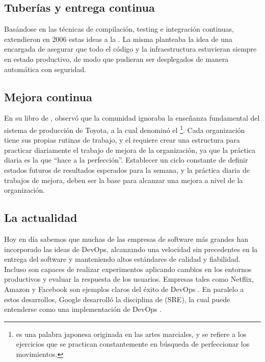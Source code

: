 \subsection{Tuberías y entrega continua}

Basándose en las técnicas de compilación, testing e integración
continuas, \citeauthor{humblefarley} extendieron en 2006 estas ideas a
la 
\cite{humblefarley}. La misma
planteaba la idea de una  encargada de
asegurar que todo el código y la infraestructura estuvieran siempre en
estado productivo, de modo que pudieran ser desplegados de manera
automática con seguridad.

\subsection{Mejora continua}

En su libro de \citeyear{toyotakata}
\cite{toyotakata}, \citeauthor{toyotakata}
observó que la comunidad  ignoraba la enseñanza
fundamental del sistema de producción de Toyota, a la cual denominó el
\footnote{  es una palabra
  japonesa originada en las artes marciales, y se refiere a los
  ejercicios que se practican constantemente en búsqueda de
  perfeccionar los movimientos.}. Cada organización tiene sus propias
rutinas de trabajo, y el  requiere crear una
estructura para practicar diariamente el trabajo de mejora de la
organización, ya que la práctica diaria es la que ``hace a la
perfección''. Establecer un ciclo constante de definir estados futuros
de resultados esperados para la semana, y la práctica diaria de
trabajos de mejora, deben ser la base para alcanzar una mejora a nivel
de la organización.

\subsection{La actualidad}

Hoy en día sabemos que muchas de las empresas de software más grandes
han incorporado las ideas de DevOps, alcanzando una velocidad sin
precedentes en la entrega del software y manteniendo altos estándares
de calidad y fiabilidad. Incluso son capaces de realizar experimentos
aplicando cambios en los entornos productivos y evaluar la respuesta
de los usuarios. Empresas tales como Netflix, Amazon y Facebook son
ejemplos claros del éxito de DevOps
\cite{handbook}. En paralelo a
estos desarrollos, Google desarrolló la disciplina de
 (SRE), la cual puede entenderse como
una implementación de DevOps
\cite{sre}.

